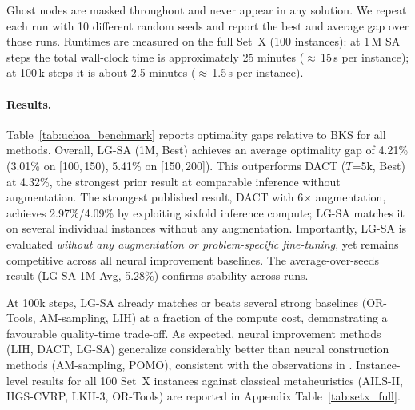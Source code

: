 \documentclass[letterpaper]{article} %
\begin{document}
Ghost nodes are masked throughout and never appear in any solution.
We repeat each run with 10 different random seeds and report the best and average gap over those runs.
Runtimes are measured on the full Set~X (100 instances): at 1\,M SA steps the total wall-clock time is approximately 25 minutes ($\approx$\,15\,s per instance); at 100\,k steps it is about 2.5 minutes ($\approx$\,1.5\,s per instance).


\paragraph{Results.}
Table~\ref{tab:uchoa_benchmark} reports optimality gaps relative to BKS for all methods.
Overall, LG-SA (1M, Best) achieves an average optimality gap of 4.21\% (3.01\% on [100,\,150), 5.41\% on [150,\,200]).
This outperforms DACT ($T$=5k, Best) at 4.32\%, the strongest prior result at comparable inference without augmentation.
The strongest published result, DACT with 6$\times$ augmentation, achieves 2.97\%/4.09\% by exploiting sixfold inference compute; LG-SA matches it on several individual instances without any augmentation.
Importantly, LG-SA is evaluated \emph{without any augmentation or problem-specific fine-tuning}, yet remains competitive across all neural improvement baselines.
The average-over-seeds result (LG-SA 1M Avg, 5.28\%) confirms stability across runs.

At 100k steps, LG-SA already matches or beats several strong baselines (OR-Tools, AM-sampling, LIH) at a fraction of the compute cost, demonstrating a favourable quality-time trade-off.
As expected, neural improvement methods (LIH, DACT, LG-SA) generalize considerably better than neural construction methods (AM-sampling, POMO), consistent with the observations in \citet{ma_learning_2021}.
Instance-level results for all 100 Set~X instances against classical metaheuristics (AILS-II, HGS-CVRP, LKH-3, OR-Tools) are reported in Appendix Table~\ref{tab:setx_full}.
\end{document}
